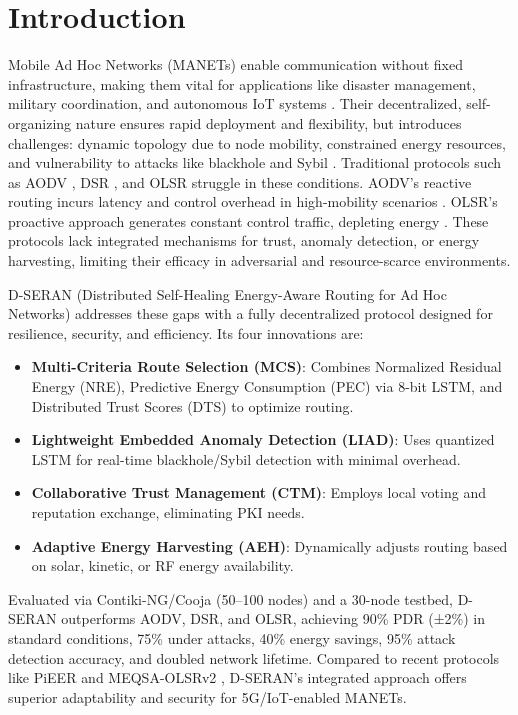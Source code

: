 \documentclass[preprint]{elsarticle}
\begin{document}

\section{Introduction}
\label{sec:introduction}

Mobile Ad Hoc Networks (MANETs) enable communication without fixed infrastructure, making them vital for applications like disaster management, military coordination, and autonomous IoT systems \cite{1,2}. Their decentralized, self-organizing nature ensures rapid deployment and flexibility, but introduces challenges: dynamic topology due to node mobility, constrained energy resources, and vulnerability to attacks like blackhole and Sybil \cite{6,7}. Traditional protocols such as AODV \cite{1}, DSR \cite{2}, and OLSR \cite{3} struggle in these conditions. AODV’s reactive routing incurs latency and control overhead in high-mobility scenarios \cite{4}. OLSR’s proactive approach generates constant control traffic, depleting energy \cite{5}. These protocols lack integrated mechanisms for trust, anomaly detection, or energy harvesting, limiting their efficacy in adversarial and resource-scarce environments.

D-SERAN (Distributed Self-Healing Energy-Aware Routing for Ad Hoc Networks) addresses these gaps with a fully decentralized protocol designed for resilience, security, and efficiency. Its four innovations are:
\begin{itemize}
    \item \textbf{Multi-Criteria Route Selection (MCS)}: Combines Normalized Residual Energy (NRE), Predictive Energy Consumption (PEC) via 8-bit LSTM, and Distributed Trust Scores (DTS) to optimize routing.
    \item \textbf{Lightweight Embedded Anomaly Detection (LIAD)}: Uses quantized LSTM for real-time blackhole/Sybil detection with minimal overhead.
    \item \textbf{Collaborative Trust Management (CTM)}: Employs local voting and reputation exchange, eliminating PKI needs.
    \item \textbf{Adaptive Energy Harvesting (AEH)}: Dynamically adjusts routing based on solar, kinetic, or RF energy availability.
\end{itemize}

Evaluated via Contiki-NG/Cooja (50–100 nodes) and a 30-node testbed, D-SERAN outperforms AODV, DSR, and OLSR, achieving 90\% PDR (±2\%) in standard conditions, 75\% under attacks, 40\% energy savings, 95\% attack detection accuracy, and doubled network lifetime. Compared to recent protocols like PiEER \cite{10} and MEQSA-OLSRv2 \cite{11}, D-SERAN’s integrated approach offers superior adaptability and security for 5G/IoT-enabled MANETs.
\end{document}
